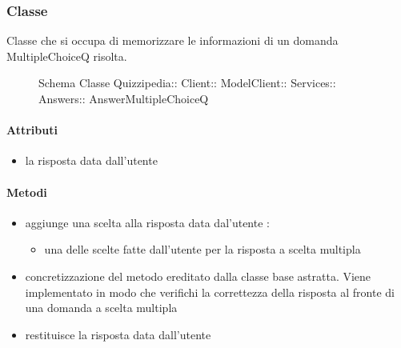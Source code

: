 \subsubsection{Classe }
Classe che si occupa di memorizzare le informazioni di un domanda MultipleChoiceQ risolta.
\begin{figure}[H]
\centering
\noindent{}
\caption[Schema Classe AnswerMultipleChoiceQ]{Schema Classe Quizzipedia:: Client:: ModelClient:: Services:: Answers:: AnswerMultipleChoiceQ}
\end{figure}
\paragraph{Attributi}
\begin{itemize}
\item {}
\newline
la risposta data dall'utente
\end{itemize}
\paragraph{Metodi}
\begin{itemize}
\item {}
\newline
aggiunge una scelta alla risposta data dal'utente
\newline
{} :
\begin{itemize}
\item {}
\newline
una delle scelte fatte dall'utente per la risposta a scelta multipla
\end{itemize}
\item {}
\newline
concretizzazione del metodo ereditato dalla classe base astratta. Viene implementato in modo che verifichi la correttezza della risposta al fronte di una domanda a scelta multipla
\newline
\item {}
\newline
restituisce la risposta data dall'utente
\newline
\end{itemize}
